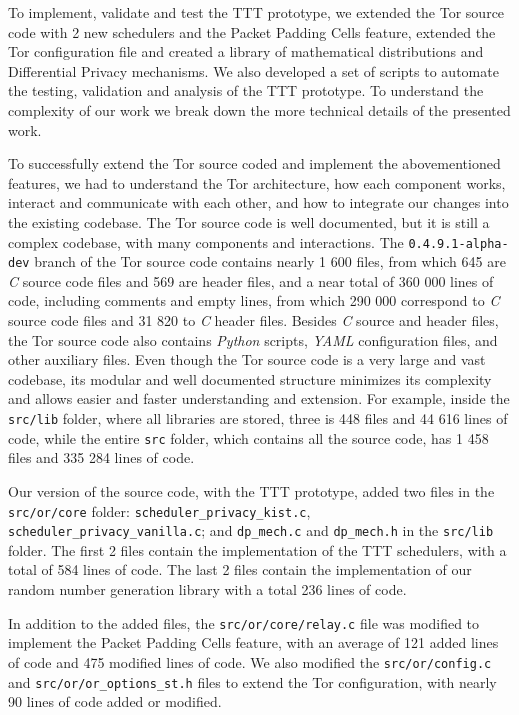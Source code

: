 To implement, validate and test the TTT prototype, we extended the Tor source code with 2 new schedulers and the Packet Padding Cells feature, extended the Tor configuration file and created a library of mathematical distributions and Differential Privacy mechanisms. We also developed a set of scripts to automate the testing, validation and analysis of the TTT prototype. To understand the complexity of our work we break down the more technical details of the presented work.

To successfully extend the Tor source coded and implement the abovementioned features, we had to understand the Tor architecture, how each component works, interact and communicate with each other, and how to integrate our changes into the existing codebase. The Tor source code is well documented, but it is still a complex codebase, with many components and interactions. The \texttt{0.4.9.1-alpha-dev} branch of the Tor source code contains nearly 1 600 files, from which 645 are \textit{C} source code files and 569 are header files, and a near total of 360 000 lines of code, including comments and empty lines, from which 290 000 correspond to \textit{C} source code files and 31 820 to \textit{C} header files. Besides \textit{C} source and header files, the Tor source code also contains \textit{Python} scripts, \textit{YAML} configuration files, and other auxiliary files. Even though the Tor source code is a very large and vast codebase, its modular and well documented structure minimizes its complexity and allows easier and faster understanding and extension. For example, inside the \texttt{src/lib} folder, where all libraries are stored, three is 448 files and 44 616 lines of code, while the entire \texttt{src} folder, which contains all the source code, has 1 458 files and 335 284 lines of code. 

Our version of the source code, with the TTT prototype, added two files in the \texttt{src/or/core} folder: \texttt{scheduler\_privacy\_kist.c}, \texttt{scheduler\_privacy\_vanilla.c}; and \texttt{dp\_mech.c} and \texttt{dp\_mech.h} in the \texttt{src/lib} folder. The first 2 files contain the implementation of the TTT schedulers, with a total of 584 lines of code. The last 2 files contain the implementation of our random number generation library with a total 236 lines of code.

In addition to the added files, the \texttt{src/or/core/relay.c} file was modified to implement the Packet Padding Cells feature, with an average of 121 added lines of code and 475 modified lines of code. We also modified the \texttt{src/or/config.c} and \texttt{src/or/or\_options\_st.h} files to extend the Tor configuration, with nearly 90 lines of code added or modified. 

